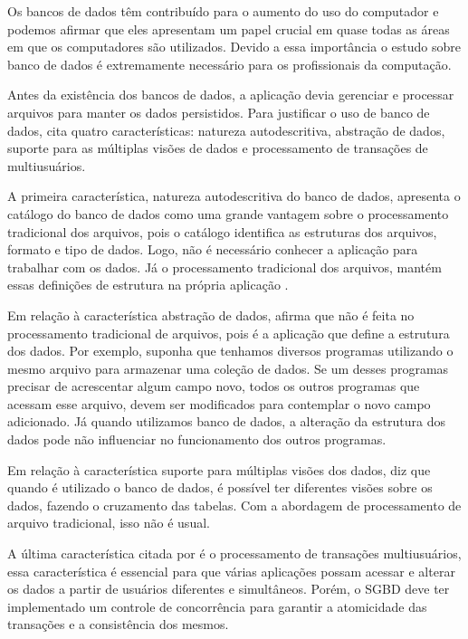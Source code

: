 Os bancos de dados têm contribuído para o aumento do uso do computador \cite{Elmasri} e podemos afirmar que eles apresentam um papel crucial em quase todas as áreas em que os computadores são utilizados. Devido a essa importância o estudo sobre banco de dados é extremamente necessário para os profissionais da computação.

Antes da existência dos bancos de dados, a aplicação devia gerenciar e processar arquivos para manter os dados persistidos. Para justificar o uso de banco de dados,  cita quatro características: natureza autodescritiva, abstração de dados, suporte para as múltiplas visões de dados e processamento de transações de multiusuários.

A primeira característica, natureza autodescritiva do banco de dados, apresenta o catálogo do banco de dados como uma grande vantagem sobre o processamento tradicional dos arquivos, pois o catálogo identifica as estruturas dos arquivos, formato e tipo de dados. Logo, não é necessário conhecer a aplicação para trabalhar com os dados. Já  o processamento tradicional dos arquivos, mantém essas definições de estrutura na própria aplicação \cite{Elmasri}.

Em relação à característica abstração de dados,  afirma que não é feita no processamento tradicional de arquivos, pois é a aplicação que define a estrutura dos dados. Por exemplo, suponha que tenhamos diversos programas utilizando o mesmo arquivo para armazenar uma coleção de dados. Se um desses programas precisar de acrescentar algum campo novo, todos os outros programas que acessam esse arquivo, devem ser modificados para contemplar o novo campo adicionado. Já quando utilizamos banco de dados, a alteração da estrutura dos dados pode não influenciar no funcionamento dos outros programas.

Em relação à característica suporte para múltiplas visões dos dados,  diz que quando é utilizado o banco de dados, é possível ter diferentes visões sobre os dados, fazendo o cruzamento das tabelas. Com a abordagem de processamento de arquivo tradicional, isso não é usual.

A última característica citada por  é o processamento de transações multiusuários, essa característica é essencial para que várias aplicações possam acessar e alterar os dados a partir de usuários diferentes e simultâneos. Porém, o \ac{SGBD} deve ter implementado um controle de concorrência para garantir a atomicidade das transações e a consistência dos mesmos.

